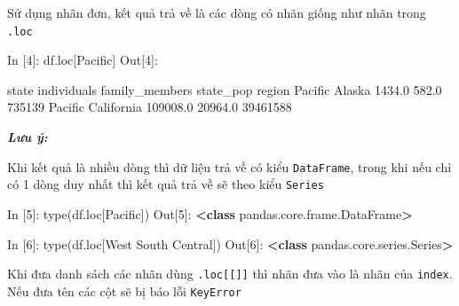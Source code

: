 \documentclass[
]{book}
\makeatletter
\newenvironment{Shaded}{\begin{snugshade}}{\end{snugshade}}
\newcommand{\BuiltInTok}[1]{#1}
\newcommand{\DecValTok}[1]{\textcolor[rgb]{0.00,0.00,0.81}{#1}}
\newcommand{\FloatTok}[1]{\textcolor[rgb]{0.00,0.00,0.81}{#1}}
\newcommand{\KeywordTok}[1]{\textcolor[rgb]{0.13,0.29,0.53}{\textbf{#1}}}
\newcommand{\NormalTok}[1]{#1}
\newcommand{\OperatorTok}[1]{\textcolor[rgb]{0.81,0.36,0.00}{\textbf{#1}}}
\newcommand{\StringTok}[1]{\textcolor[rgb]{0.31,0.60,0.02}{#1}}
\newenvironment{kframe}{%
\medskip{}
\setlength{\fboxsep}{.8em}
 \def\at@end@of@kframe{}%
 \ifinner\ifhmode%
  \def\at@end@of@kframe{\end{minipage}}%
  \begin{minipage}{\columnwidth}%
 \fi\fi%
 \def\FrameCommand##1{\hskip\@totalleftmargin \hskip-\fboxsep
 \colorbox{shadecolor}{##1}\hskip-\fboxsep
     \hskip-\linewidth \hskip-\@totalleftmargin \hskip\columnwidth}%
 \MakeFramed {\advance\hsize-\width
   \@totalleftmargin\z@ \linewidth\hsize
   \@setminipage}}%
 {\par\unskip\endMakeFramed%
 \at@end@of@kframe}
\newenvironment{rmdblock}[1]
  {
  \begin{itemize}
  \renewcommand{\labelitemi}{
    \raisebox{-.7\height}[0pt][0pt]{
      {\setkeys{Gin}{width=3em,keepaspectratio}\texttt{[image: images/\#1]}}
    }
  }
  \setlength{\fboxsep}{1em}
  \begin{kframe}
  \item
  }
  {
  \end{kframe}
  \end{itemize}
  }
\newenvironment{rmdnote}
  {\begin{rmdblock}{note}}
  {\end{rmdblock}}
\makeatother
\begin{document}
Sử dụng nhãn đơn, kết quả trả về là các dòng có nhãn giống như nhãn trong \texttt{.loc}

\begin{Shaded}
\begin{Highlighting}[]

\NormalTok{In [}\DecValTok{4}\NormalTok{]: df.loc[}\StringTok{\textquotesingle{}Pacific\textquotesingle{}}\NormalTok{]}
\NormalTok{Out[}\DecValTok{4}\NormalTok{]:               }
              
\NormalTok{              state  individuals  family\_members  state\_pop}
\NormalTok{region                                                     }
\NormalTok{Pacific      Alaska       }\FloatTok{1434.0}           \FloatTok{582.0}     \DecValTok{735139}
\NormalTok{Pacific  California     }\FloatTok{109008.0}         \FloatTok{20964.0}   \DecValTok{39461588}
\end{Highlighting}
\end{Shaded}

\begin{rmdnote}
\textbf{\emph{Lưu ý:}}

Khi kết quả là nhiều dòng thì dữ liệu trả về có kiểu \texttt{DataFrame}, trong khi nếu chỉ có 1 dòng duy nhất thì kết quả trả về sẽ theo kiểu \texttt{Series}
\end{rmdnote}

\begin{Shaded}
\begin{Highlighting}[]
\NormalTok{In [}\DecValTok{5}\NormalTok{]: }\BuiltInTok{type}\NormalTok{(df.loc[}\StringTok{\textquotesingle{}Pacific\textquotesingle{}}\NormalTok{])}
\NormalTok{Out[}\DecValTok{5}\NormalTok{]: }
\OperatorTok{\textless{}}\KeywordTok{class} \StringTok{\textquotesingle{}pandas.core.frame.DataFrame\textquotesingle{}}\OperatorTok{\textgreater{}}

\NormalTok{In [}\DecValTok{6}\NormalTok{]: }\BuiltInTok{type}\NormalTok{(df.loc[}\StringTok{\textquotesingle{}West South Central\textquotesingle{}}\NormalTok{])}
\NormalTok{Out[}\DecValTok{6}\NormalTok{]: }
\OperatorTok{\textless{}}\KeywordTok{class} \StringTok{\textquotesingle{}pandas.core.series.Series\textquotesingle{}}\OperatorTok{\textgreater{}}
\end{Highlighting}
\end{Shaded}

Khi đưa danh sách các nhãn dùng \texttt{.loc{[}{[}{]}{]}} thì nhãn đưa vào là nhãn của \texttt{index}. Nếu đưa tên các cột sẽ bị báo lỗi \texttt{KeyError}
\end{document}
